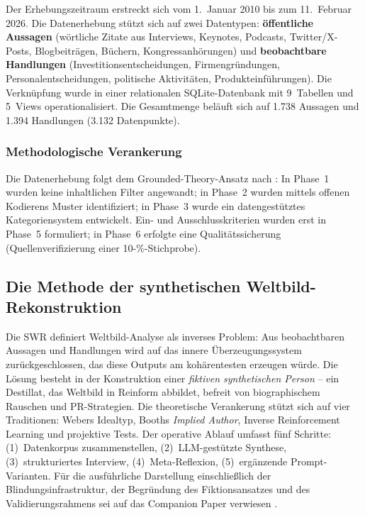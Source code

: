 \documentclass[12pt,a4paper]{article}
\begin{document}
Der Erhebungszeitraum erstreckt sich vom 1.~Januar 2010 bis zum 11.~Februar 2026. Die Datenerhebung st\"utzt sich auf zwei Datentypen: \textbf{\"offentliche Aussagen} (w\"ortliche Zitate aus Interviews, Keynotes, Podcasts, Twitter/X-Posts, Blogbeitr\"agen, B\"uchern, Kongressanh\"orungen) und \textbf{beobachtbare Handlungen} (Investitionsentscheidungen, Firmengr\"undungen, Personalentscheidungen, politische Aktivit\"aten, Produkteinf\"uhrungen). Die Verkn\"upfung wurde in einer relationalen SQLite-Datenbank mit 9~Tabellen und 5~Views operationalisiert. Die Gesamtmenge bel\"auft sich auf 1.738 Aussagen und 1.394 Handlungen (3.132 Datenpunkte).

\subsubsection{Methodologische Verankerung}

Die Datenerhebung folgt dem Grounded-Theory-Ansatz nach \citet{StraussCorbin1990}: In Phase~1 wurden keine inhaltlichen Filter angewandt; in Phase~2 wurden mittels offenen Kodierens Muster identifiziert; in Phase~3 wurde ein datengest\"utztes Kategoriensystem entwickelt. Ein- und Ausschlusskriterien wurden erst in Phase~5 formuliert; in Phase~6 erfolgte eine Qualit\"atssicherung (Quellenverifizierung einer 10-\%-Stichprobe).


\subsection{Die Methode der synthetischen Weltbild-Rekonstruktion}
\label{sec:methodik:swr}

Die SWR definiert Weltbild-Analyse als inverses Problem: Aus beobachtbaren Aussagen und Handlungen wird auf das innere \"Uberzeugungssystem zur\"uckgeschlossen, das diese Outputs am koh\"arentesten erzeugen w\"urde. Die L\"osung besteht in der Konstruktion einer \emph{fiktiven synthetischen Person} -- ein Destillat, das Weltbild in Reinform abbildet, befreit von biographischem Rauschen und PR-Strategien. Die theoretische Verankerung st\"utzt sich auf vier Traditionen: Webers Idealtyp, Booths \emph{Implied Author}, Inverse Reinforcement Learning und projektive Tests. Der operative Ablauf umfasst f\"unf Schritte: (1)~Datenkorpus zusammenstellen, (2)~LLM-gest\"utzte Synthese, (3)~strukturiertes Interview, (4)~Meta-Reflexion, (5)~erg\"anzende Prompt-Varianten. F\"ur die ausf\"uhrliche Darstellung einschlie\ss{}lich der Blindungsinfrastruktur, der Begr\"undung des Fiktionsansatzes und des Validierungsrahmens sei auf das Companion Paper verwiesen \citep{Geiger2026SWR}.
\end{document}
